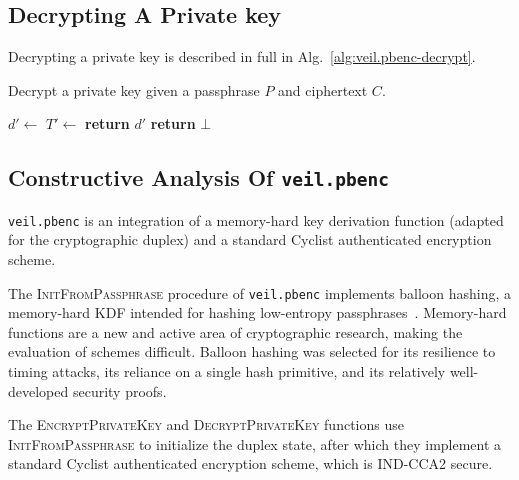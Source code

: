 \subsection{Decrypting A Private key}\label{subsec:veil.pbenc-decrypt}

Decrypting a private key is described in full in Alg.~\ref{alg:veil.pbenc-decrypt}\@.

\begin{algorithm}[ht]
    \caption{
        Decrypt a private key given a passphrase $P$ and ciphertext $C$.
    }
    \begin{algorithmic}
            \State {}
            \State $d' \gets$
            \State $T' \gets$
            \State \textbf{return} $d'$
            \Else
                \State \textbf{return} $\bot$
            \EndIf
        \EndFunction
    \end{algorithmic}
    \label{alg:veil.pbenc-decrypt}
\end{algorithm}

\subsection{Constructive Analysis Of \texttt{veil.pbenc}}\label{subsec:veil.pbenc-analysis}

\texttt{veil.pbenc} is an integration of a memory-hard key derivation function \@(adapted for the cryptographic duplex)
and a standard Cyclist authenticated encryption scheme.

The \textsc{InitFromPassphrase} procedure of \texttt{veil.pbenc} implements balloon hashing, a memory-hard KDF intended
for hashing low-entropy passphrases~\cite{boneh2016}.
Memory-hard functions are a new and active area of cryptographic research, making the evaluation of schemes difficult.
Balloon hashing was selected for its resilience to timing attacks, its reliance on a single hash primitive, and its
relatively well-developed security proofs.

The \textsc{EncryptPrivateKey} and \textsc{DecryptPrivateKey} functions use \textsc{InitFromPassphrase} to initialize
the duplex state, after which they implement a standard Cyclist authenticated encryption scheme, which is IND-CCA2
secure.
